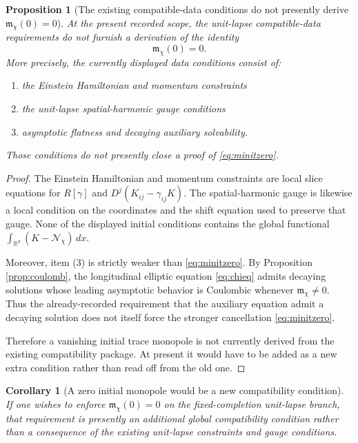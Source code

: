 \documentclass[11pt]{article}
\newtheorem{proposition}{Proposition}
\newtheorem{corollary}{Corollary}
\begin{document}
\begin{proposition}[The existing compatible-data conditions do not presently derive \(\mathfrak m_\chi(0)=0\)]
\label{prop:initfail}
At the present recorded scope, the unit-lapse compatible-data requirements do not furnish a derivation of the identity
\begin{equation}
\mathfrak m_\chi(0)=0.
\label{eq:minitzero}
\end{equation}
More precisely, the currently displayed data conditions consist of:
\begin{enumerate}
    \item the Einstein Hamiltonian and momentum constraints
    \item the unit-lapse spatial-harmonic gauge conditions
    \item asymptotic flatness and decaying auxiliary solvability.
\end{enumerate}
Those conditions do not presently close a proof of \eqref{eq:minitzero}.
\end{proposition}

\begin{proof}
The Einstein Hamiltonian and momentum constraints are local slice equations for \(R[\gamma]\) and \(D^j(K_{ij}-\gamma_{ij}K)\). The spatial-harmonic gauge is likewise a local condition on the coordinates and the shift equation used to preserve that gauge. None of the displayed initial conditions contains the global functional \(\int_{\mathbb R^3}(K-\mathcal N_\chi)\,dx\).

Moreover, item (3) is strictly weaker than \eqref{eq:minitzero}. By Proposition \ref{prop:coulomb}, the longitudinal elliptic equation \eqref{eq:chieq} admits decaying solutions whose leading asymptotic behavior is Coulombic whenever \(\mathfrak m_\chi\neq 0\). Thus the already-recorded requirement that the auxiliary equation admit a decaying solution does not itself force the stronger cancellation \eqref{eq:minitzero}.

Therefore a vanishing initial trace monopole is not currently derived from the existing compatibility package. At present it would have to be added as a new extra condition rather than read off from the old one.
\end{proof}

\begin{corollary}[A zero initial monopole would be a new compatibility condition]
\label{cor:newcompat}
If one wishes to enforce \(\mathfrak m_\chi(0)=0\) on the fixed-completion unit-lapse branch, that requirement is presently an additional global compatibility condition rather than a consequence of the existing unit-lapse constraints and gauge conditions.
\end{corollary}
\end{document}
